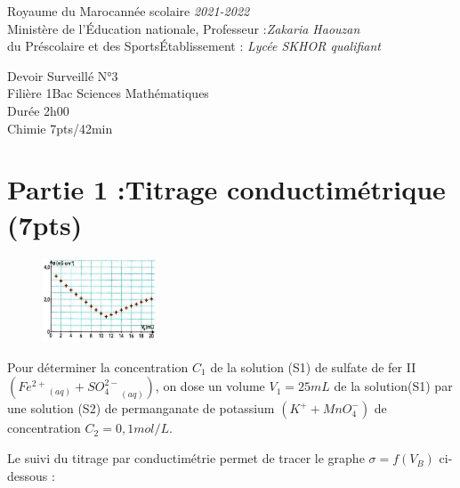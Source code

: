 \documentclass[12pt]{article}
\newcommand\headerMe[2]{\noindent{}#1\hfill#2}
\begin{document}
\headerMe{Royaume du Maroc}{année scolaire \emph{2021-2022}}\\
\headerMe{Ministère de l'Éducation nationale, }{  Professeur :\emph{Zakaria Haouzan}}\\
\headerMe{du Préscolaire et des Sports}{Établissement : \emph{Lycée SKHOR qualifiant}}\\

\begin{center}
Devoir Surveillé  N°3 \\
    Filière 1Bac Sciences Mathématiques \\
Durée 2h00
\\
    \vspace{.2cm}
\hrulefill
\Large{Chimie 7pts/42min}
\hrulefill\\

\end{center}

 \section*{Partie 1 :Titrage conductimétrique \dotfill(7pts) }

\begin{figure}
  \begin{center}
    \vspace{-1cm}
    \includegraphics[width=0.3\textwidth]{./img/Screenshot from 2022-05-11 17-55-37.png}
  \end{center}
\end{figure}
Pour déterminer la concentration $C_1$ de la solution (S1) de sulfate de fer II $({Fe^{2+}}_{(aq)} + {SO_4^{2-}}_{(aq)})$, on dose un volume $V_1=25 mL$ de la solution(S1) par une solution (S2) de permanganate de potassium $(K^+ + MnO_4^-)$ de concentration $C_2=0,1 mol/L.$
 
 Le suivi du titrage par conductimétrie permet de tracer le graphe $\sigma = f(V_B)$ ci-dessous :
\end{document}
